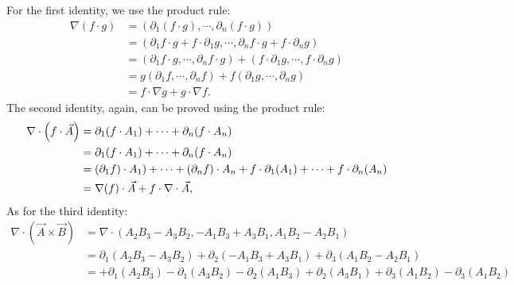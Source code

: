 \documentclass[11pt]{article}
\begin{document}
\begin{solution}
    For the first identity, we use the product rule:
    \begin{align*}
        \nabla\left( f \cdot g \right)
        &= 
        \left( \partial_1 ( f \cdot g ), \cdots, \partial_n ( f \cdot g ) \right)
        \\&= 
        \left( \partial_1 f \cdot g + f \cdot \partial_1 g, \cdots, \partial_n f \cdot g + f \cdot \partial_n g \right)
        \\&= 
        \left( \partial_1 f \cdot g, \cdots, \partial_n f \cdot g \right)
        +
        \left( f \cdot \partial_1 g, \cdots, f \cdot \partial_n g \right)
        \\&= 
        g \left( \partial_1 f, \cdots, \partial_n f \right)
        +
        f \left( \partial_1 g, \cdots, \partial_n g \right)
        \\&= 
        f \cdot \nabla g
        +
        g \cdot \nabla f
        .
    \end{align*}
    The second identity, again, can be proved using the product rule:
    \begin{align*}
        \nabla\cdot\left( f \cdot \vec{A} \right)
        &= 
        \partial_1 ( f \cdot A_{1} ) + \cdots + \partial_n ( f \cdot A_{n} )
        \\&= 
        \partial_1 ( f \cdot A_{1} ) + \cdots + \partial_n ( f \cdot A_{n} )
        \\&= 
        ( \partial_1 f ) \cdot A_{1} ) + \cdots + ( \partial_n f ) \cdot A_{n}
        +
        f \cdot \partial_1 ( A_{1} ) + \cdots + f \cdot \partial_n ( A_{n} )
        \\&= 
        \nabla(f) \cdot \vec{A}
        +
        f \cdot \nabla \cdot \vec{A}
        ,
    \end{align*}
    As for the third identity:
    \begin{align*}
        \nabla\cdot\left( \vec{A} \times \vec{B} \right)
        &=
        \nabla\cdot\left( 
            A_2 B_3 - A_3 B_2,
          - A_1 B_3 + A_3 B_1,
            A_1 B_2 - A_2 B_1 
        \right)
        \\&=
        \partial_1\left(   A_2 B_3 - A_3 B_2 \right) + \partial_2\left( - A_1 B_3 + A_3 B_1 \right) + \partial_3\left(   A_1 B_2 - A_2 B_1 \right)
        \\&=
        + \partial_1\left( A_2 B_3 \right) - \partial_1\left( A_3 B_2 \right) 
        - \partial_2\left( A_1 B_3 \right) + \partial_2\left( A_3 B_1 \right) 
        + \partial_3\left( A_1 B_2 \right) - \partial_3\left( A_1 B_2 \right)

\end{align*}
\end{solution}
\end{document}
